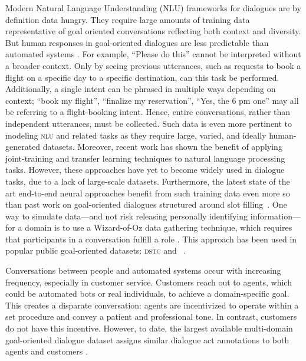 Modern Natural Language Understanding (NLU) frameworks for dialogues are by definition data hungry.  They require large amounts of training data representative of goal oriented conversations reflecting both context and diversity. But human responses in goal-oriented dialogues are less predictable than automated systems \citep{bordes2016learning}.  For example, ``Please do this'' cannot be interpreted without a broader context.  Only by seeing previous utterances, such as requests to book a flight on a specific day to a specific destination, can this task be performed.  Additionally, a single intent can be phrased in multiple ways depending on context; ``book my flight'', ``finalize my reservation'', ``Yes, the 6 pm one'' may all be referring to a flight-booking intent. Hence, entire conversations, rather than independent utterances, must be collected.  Such data is even more pertinent to modeling  \textsc{nlu} and related tasks as they require large, varied, and ideally human-generated datasets. Moreover, recent work \citep{dong2015multi,devlin2018bert} has shown the benefit of applying 
joint-training and transfer learning techniques to natural language processing tasks.
However, these approaches have yet to become widely used in dialogue tasks, due to a lack of large-scale datasets. Furthermore, the latest state of the art end-to-end neural approaches benefit from such training data even more so than past work on goal-oriented dialogues structured around slot filling~\citep{lemon2006isu,wang2013simple}.  One way to simulate data---and not risk releasing personally identifying information---for a domain is to use a Wizard-of-Oz data gathering technique, which requires that participants in a conversation fulfill a role \citep{kelley1984iterative}.  This approach has been used in popular public goal-oriented datasets: \textsc{dstc} and \multiwoz~\citep{williams2016dialog, budzianowski2018multiwoz}.

Conversations between people and automated systems occur with increasing frequency, especially in customer service.  Customers reach out to agents, which could be automated bots or real individuals, to achieve a domain-specific goal.  This creates a disparate conversation: agents are incentivized to operate within a set procedure and convey a patient and professional tone. In contrast, customers do not have this incentive. However, to date, the largest available multi-domain goal-oriented dialogue dataset assigns similar dialogue act annotations to both agents and customers \citep{budzianowski2018multiwoz}.   

